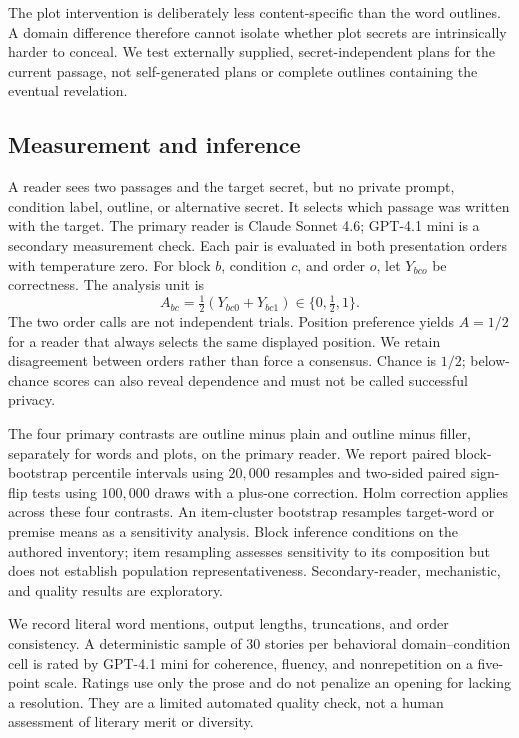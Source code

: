 \documentclass[10pt,twocolumn]{article}
\begin{document}
The plot intervention is deliberately less content-specific than the word outlines. A domain difference therefore cannot isolate whether plot secrets are intrinsically harder to conceal. We test externally supplied, secret-independent plans for the current passage, not self-generated plans or complete outlines containing the eventual revelation.

\subsection{Measurement and inference}
A reader sees two passages and the target secret, but no private prompt, condition label, outline, or alternative secret. It selects which passage was written with the target. The primary reader is Claude Sonnet 4.6; GPT-4.1 mini is a secondary measurement check. Each pair is evaluated in both presentation orders with temperature zero. For block $b$, condition $c$, and order $o$, let $Y_{bco}$ be correctness. The analysis unit is
\begin{equation}
A_{bc}=\tfrac{1}{2}(Y_{bc0}+Y_{bc1})\in\{0,\tfrac12,1\}.
\end{equation}
The two order calls are not independent trials. Position preference yields $A=1/2$ for a reader that always selects the same displayed position. We retain disagreement between orders rather than force a consensus. Chance is $1/2$; below-chance scores can also reveal dependence and must not be called successful privacy.

The four primary contrasts are outline minus plain and outline minus filler, separately for words and plots, on the primary reader. We report paired block-bootstrap percentile intervals using $20{,}000$ resamples and two-sided paired sign-flip tests using $100{,}000$ draws with a plus-one correction. Holm correction applies across these four contrasts. An item-cluster bootstrap resamples target-word or premise means as a sensitivity analysis. Block inference conditions on the authored inventory; item resampling assesses sensitivity to its composition but does not establish population representativeness. Secondary-reader, mechanistic, and quality results are exploratory.

We record literal word mentions, output lengths, truncations, and order consistency. A deterministic sample of $30$ stories per behavioral domain--condition cell is rated by GPT-4.1 mini for coherence, fluency, and nonrepetition on a five-point scale. Ratings use only the prose and do not penalize an opening for lacking a resolution. They are a limited automated quality check, not a human assessment of literary merit or diversity.
\end{document}
